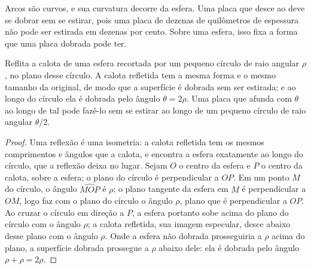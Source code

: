Arcos são curvos, e sua curvatura decorre da esfera. Uma placa que desce ao  deve se dobrar sem se estirar, pois uma placa de dezenas de quilômetros de espessura não pode ser estirada em dezenas por cento. Sobre uma esfera, isso fixa a forma que uma placa dobrada pode ter.

\begin{proposition}\label{prop:b1:active-margins:shell}
Reflita a calota de uma esfera recortada por um pequeno círculo de raio angular $\rho$, no plano desse círculo. A calota refletida tem a mesma forma e o mesmo tamanho da original, de modo que a superfície é dobrada sem ser estirada; e ao longo do círculo ela é dobrada pelo ângulo $\theta = 2\rho$. Uma placa que afunda com  $\theta$ ao longo de tal  pode fazê-lo sem se estirar ao longo de um pequeno círculo de raio angular $\theta/2$.
\end{proposition}

\begin{proof}
Uma reflexão é uma isometria: a calota refletida tem os mesmos comprimentos e ângulos que a calota, e encontra a esfera exatamente ao longo do círculo, que a reflexão deixa no lugar. Sejam $O$ o centro da esfera e $P$ o centro da calota, sobre a esfera; o plano do círculo é perpendicular a $OP$. Em um ponto $M$ do círculo, o ângulo $\widehat{MOP}$ é $\rho$; o plano tangente da esfera em $M$ é perpendicular a $OM$, logo faz com o plano do círculo o ângulo $\rho$, plano que é perpendicular a $OP$. Ao cruzar o círculo em direção a $P$, a esfera portanto sobe acima do plano do círculo com o ângulo $\rho$; a calota refletida, sua imagem especular, desce abaixo desse plano com o ângulo $\rho$. Onde a esfera não dobrada prosseguiria a $\rho$ acima do plano, a superfície dobrada prossegue a $\rho$ abaixo dele: ela é dobrada pelo ângulo $\rho + \rho = 2\rho$.
\end{proof}

